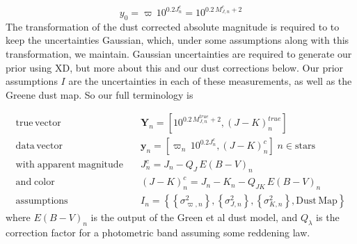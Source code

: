 \documentclass[modern]{aastex61}
\newcommand{\acronym}[1]{{\small{#1}}}
\newcommand{\xd}{\acronym{XD}}
\begin{document}
\begin{equation}
y_0 = \varpi\,10^{0.2J^c_n} = 10^{0.2\,M^c_{J,n} + 2}
\label{eq:transform}
\end{equation}
The transformation of the dust corrected absolute magnitude is required to to keep the uncertainties Gaussian, which, under some assumptions along with this transformation, we maintain. Gaussian uncertainties are required to generate our prior using \xd, but more about this and our dust corrections below.
Our prior assumptions $I$ are the uncertainties in each of these measurements, as well as the Greene dust map. So our full terminology is

\begin{equation}
\begin{aligned}
\mathrm{true \, vector} \quad &\mathbf{Y}_n = [10^{0.2\,M^{true}_{J,n} + 2}, (J-K)^{true}_n] \\
\mathrm{data \, vector} \quad &\mathbf{y}_n = [\varpi_n\,10^{0.2J^c_n}, (J- K)^c_n] \;  n \in \mathrm{stars} \\
\mathrm{with \; apparent \; magnitude} \quad &J^c_n = J_n - Q_J\,E(B-V)_n \\
\mathrm{and \; color} \quad &(J - K)^c_n = J_n - K_n - Q_{JK}\,E(B-V)_n \\
\mathrm{assumptions} \quad &I_n = \left\{\left\{\sigma^2_{\varpi, n}\right\}, \left\{\sigma^2_{J,n}\right\}, \left\{\sigma^2_{K,n}\right\}, \mathrm{Dust \, Map}\right\}
\end{aligned}
\label{eq:data}
\end{equation}
where $E(B-V)_n$ is the output of the Green et al dust model, and $Q_{\lambda}$ is the correction factor for a photometric band assuming some reddening law.
\end{document}
